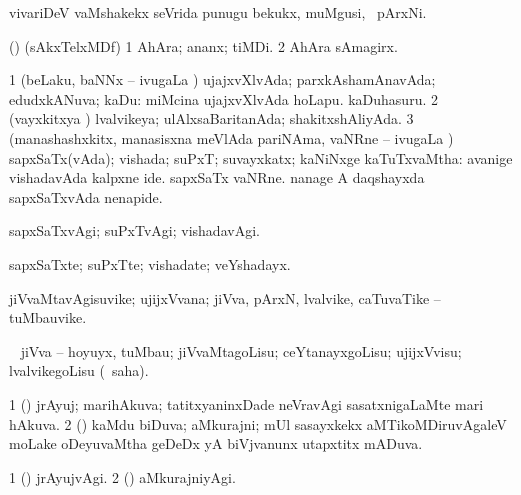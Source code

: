 {{{{{{{{{{{{\bentry 
{} 
\gl{\nA}
\expl{}
\bmng
 vivariDeV vaMshakekx seVrida punugu bekukx, muMgusi, \mo\ pArxNi. 
\emng
\eentry

\bentry
{} 
\gl{\nA}
\expl{}
\bmng
 (\bava) (sAkxTelxMDf) 
\bnum
\num{1} AhAra; ananx; tiMDi. 
\num{2} AhAra sAmagirx. 
\enum
\emng
\eentry

\bentry 
{} 
\gl{\gu}
\expl{}
\bmng
\bnum
\num{1} (beLaku, baNNx -- ivugaLa \vi) ujajxvXlvAda; parxkAshamAnavAda; edudxkANuva; kaDu:  miMcina ujajxvXlvAda hoLapu.  kaDuhasuru. 
\num{2} (vayxkitxya \vi) lvalvikeya; ulAlxsaBaritanAda; shakitxshAliyAda. 
\num{3} (manashashxkitx, manasisxna meVlAda pariNAma, vaNRne -- ivugaLa \vi) sapxSaTx(vAda); vishada; suPxT; suvayxkatx; kaNiNxge kaTuTxvaMtha:  avanige vishadavAda kalpxne ide.  sapxSaTx vaNRne.  nanage A daqshayxda sapxSaTxvAda nenapide. 
\enum
\emng
\eentry

\bentry 
{} 
\gl{\kirxvi}
\expl{}
\bmng
 sapxSaTxvAgi; suPxTvAgi; vishadavAgi. 
\emng
\eentry

\bentry 
{} 
\gl{\nA}
\expl{}
\bmng
 sapxSaTxte; suPxTte; vishadate; veYshadayx. 
\emng
\eentry

\bentry
{} 
\gl{\nA}
\expl{}
\bmng
 jiVvaMtavAgisuvike; ujijxVvana; jiVva, pArxN, lvalvike, caTuvaTike -- tuMbauvike. 
\emng
\eentry

\bentry
{} 
\gl{\akirx}
\BUkaq\  \bmng
 jiVva -- hoyuyx, tuMbau; jiVvaMtagoLisu; ceYtanayxgoLisu; ujijxVvisu; lvalvikegoLisu (\rUpa\ saha). 
\emng
\eentry

\bentry 
{} 
\gl{\nA}
\expl{}
\bmng
\emng
\eentry

\bentry 
{} 
\gl{\gu}
\expl{}
\bmng
\bnum
\num{1} (\pArxvi) jrAyuj; marihAkuva; tatitxyaninxDade neVravAgi sasatxnigaLaMte mari hAkuva. 
\num{2} (\savi) kaMdu biDuva; aMkurajni; mUl sasayxkekx aMTikoMDiruvAgaleV moLake oDeyuvaMtha geDeDx yA biVjvanunx utapxtitx mADuva. 
\enum
\emng
\eentry

\bentry 
{} 
\gl{\kirxvi}
\expl{}
\bmng
\bnum
\num{1} (\pArxvi) jrAyujvAgi. 
\num{2} (\savi) aMkurajniyAgi. 
\enum
\emng
\eentry

}}}}}}}}}}}}
